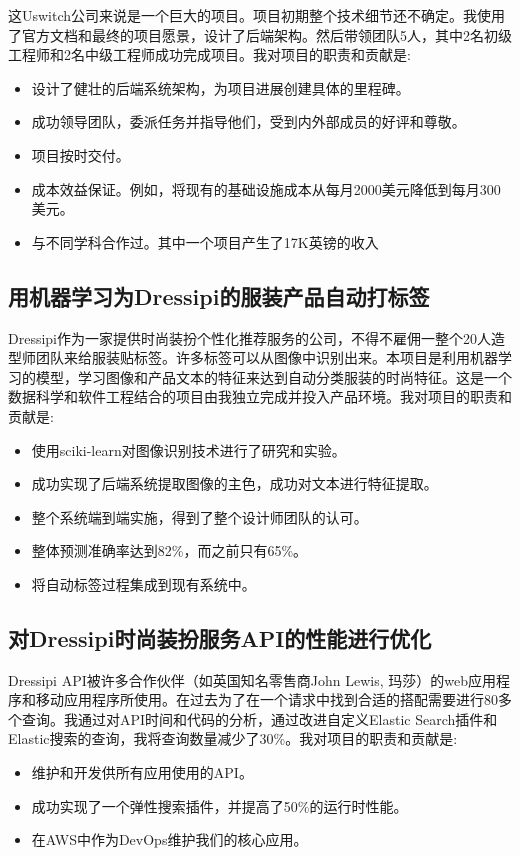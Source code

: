 \documentclass[a4paper]{twentysecondcv-chinese} %
\begin{document}
这Uswitch公司来说是一个巨大的项目。项目初期整个技术细节还不确定。我使用了官方文档和最终的项目愿景，设计了后端架构。然后带领团队5人，其中2名初级工程师和2名中级工程师成功完成项目。我对项目的职责和贡献是:
\begin{itemize}
  \item 设计了健壮的后端系统架构，为项目进展创建具体的里程碑。
  \item 成功领导团队，委派任务并指导他们，受到内外部成员的好评和尊敬。
  \item 项目按时交付。
  \item 成本效益保证。例如，将现有的基础设施成本从每月2000美元降低到每月300美元。
  \item 与不同学科合作过。其中一个项目产生了17K英镑的收入
\end{itemize}

\subsection{用机器学习为Dressipi的服装产品自动打标签}

Dressipi作为一家提供时尚装扮个性化推荐服务的公司，不得不雇佣一整个20人造型师团队来给服装贴标签。许多标签可以从图像中识别出来。本项目是利用机器学习的模型，学习图像和产品文本的特征来达到自动分类服装的时尚特征。这是一个数据科学和软件工程结合的项目由我独立完成并投入产品环境。我对项目的职责和贡献是:
\begin{itemize}
  \item 使用sciki-learn对图像识别技术进行了研究和实验。
  \item 成功实现了后端系统提取图像的主色，成功对文本进行特征提取。
  \item 整个系统端到端实施，得到了整个设计师团队的认可。
  \item 整体预测准确率达到82\%，而之前只有65\%。
  \item 将自动标签过程集成到现有系统中。
\end{itemize}

\newpage %
\makesidebar

\subsection{对Dressipi时尚装扮服务API的性能进行优化}

Dressipi API被许多合作伙伴（如英国知名零售商John Lewis, 玛莎）的web应用程序和移动应用程序所使用。在过去为了在一个请求中找到合适的搭配需要进行80多个查询。我通过对API时间和代码的分析，通过改进自定义Elastic Search插件和Elastic搜索的查询，我将查询数量减少了30\%。我对项目的职责和贡献是:
\begin{itemize}
  \item 维护和开发供所有应用使用的API。
  \item 成功实现了一个弹性搜索插件，并提高了50\%的运行时性能。
  \item 在AWS中作为DevOps维护我们的核心应用。
\end{itemize}
\end{document}
